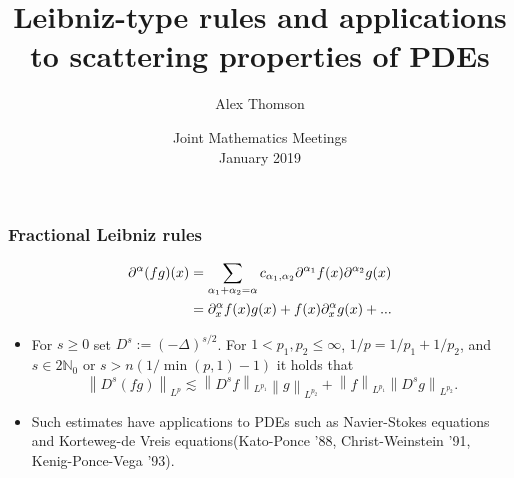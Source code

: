 \documentclass[xcolor=dvipsnames]{beamer}
\title[Leibniz-type rules]{Leibniz-type rules and applications to scattering
properties of PDEs}
\author[Alex Thomson]{Alex Thomson}
\institute[Kansas State University]{
Department of Mathematics \\
Kansas State University
 }
\date[January 2019]{Joint Mathematics Meetings\\ January 2019}
\newcommand{\na}{\mathbb{N}}
\newcommand{\fr}[2]{{\textstyle \frac{#1}{#2}}}
\newcommand{\norm}[2]{{\left\| #1 \right\|}_{#2}}
\newcommand{\hcline}{1/p=1/p_1+1/p_2}
\begin{document}
\begin{frame}[plain]
  \titlepage
\end{frame}


\begin{frame}\frametitle{Fractional Leibniz rules}
\begin{align*}
\partial^\alpha(fg)(x) & = \sum_{\alpha_1 + \alpha_2 = \alpha} c_{\alpha_1,\alpha_2} \partial^{\alpha_1} f(x) \partial^{\alpha_2} g(x)\\ \medskip
& =\partial^\alpha_x f(x) g(x) + f(x) \partial^\alpha_x g(x) + ...
\end{align*}
\medskip
\begin{itemize}
\item  For $s \ge 0$ set $D^s:=(-\Delta)^{s/2}$. For $1<p_1,p_2\le \infty$, $\hcline$, and $s\in 2\na_0 \text{ or } s>n({1}/{\min(p,1)}-1)$ it holds that 
\[
   \norm{D^s(fg)}{L^p} \lesssim  \norm{D^sf}{L^{p_1}} \norm{g}{L^{p_2}}+ \norm{f}{L^{p_1}} \norm{D^sg}{L^{p_2}}.
\]
\medskip
\item Such estimates have applications to PDEs such as Navier-Stokes equations and Korteweg-de Vreis equations(Kato-Ponce '88, Christ-Weinstein '91, Kenig-Ponce-Vega '93).
\end{itemize}

\end{frame}


%
\end{document}
